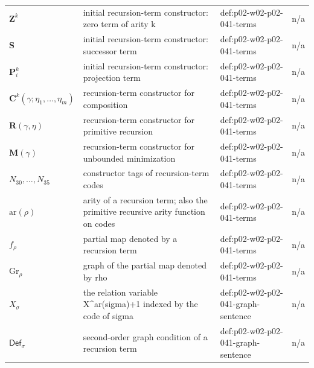 \begin{longtable}{@{}p{}p{}p{}p{}@{}}
\(\mathbf Z^k\) & initial recursion-term constructor: zero term of arity k & def:\allowbreak{}p02-\allowbreak{}w02-\allowbreak{}p02-\allowbreak{}041-\allowbreak{}terms & n/a \\
\(\mathbf S\) & initial recursion-term constructor: successor term & def:\allowbreak{}p02-\allowbreak{}w02-\allowbreak{}p02-\allowbreak{}041-\allowbreak{}terms & n/a \\
\(\mathbf P^k_i\) & initial recursion-term constructor: projection term & def:\allowbreak{}p02-\allowbreak{}w02-\allowbreak{}p02-\allowbreak{}041-\allowbreak{}terms & n/a \\
\(\mathbf C^k(\gamma;\allowbreak \eta_1,\allowbreak \ldots,\allowbreak \eta_m)\) & recursion-term constructor for composition & def:\allowbreak{}p02-\allowbreak{}w02-\allowbreak{}p02-\allowbreak{}041-\allowbreak{}terms & n/a \\
\(\mathbf R(\gamma,\allowbreak \eta)\) & recursion-term constructor for primitive recursion & def:\allowbreak{}p02-\allowbreak{}w02-\allowbreak{}p02-\allowbreak{}041-\allowbreak{}terms & n/a \\
\(\mathbf M(\gamma)\) & recursion-term constructor for unbounded minimization & def:\allowbreak{}p02-\allowbreak{}w02-\allowbreak{}p02-\allowbreak{}041-\allowbreak{}terms & n/a \\
\(N_{30},\allowbreak \ldots,\allowbreak N_{35}\) & constructor tags of recursion-term codes & def:\allowbreak{}p02-\allowbreak{}w02-\allowbreak{}p02-\allowbreak{}041-\allowbreak{}terms & n/a \\
\(\mathrm{ar}(\rho)\) & arity of a recursion term; also the primitive recursive arity function on codes & def:\allowbreak{}p02-\allowbreak{}w02-\allowbreak{}p02-\allowbreak{}041-\allowbreak{}terms & n/a \\
\(f_\rho\) & partial map denoted by a recursion term & def:\allowbreak{}p02-\allowbreak{}w02-\allowbreak{}p02-\allowbreak{}041-\allowbreak{}terms & n/a \\
\(\mathrm{Gr}_\rho\) & graph of the partial map denoted by rho & def:\allowbreak{}p02-\allowbreak{}w02-\allowbreak{}p02-\allowbreak{}041-\allowbreak{}terms & n/a \\
\(X_\sigma\) & the relation variable X\^{}{ar(sigma)+1} indexed by the code of sigma & def:\allowbreak{}p02-\allowbreak{}w02-\allowbreak{}p02-\allowbreak{}041-\allowbreak{}graph-\allowbreak{}sentence & n/a \\
\(\mathsf{Def}_\sigma\) & second-order graph condition of a recursion term & def:\allowbreak{}p02-\allowbreak{}w02-\allowbreak{}p02-\allowbreak{}041-\allowbreak{}graph-\allowbreak{}sentence & n/a \\

\end{longtable}
